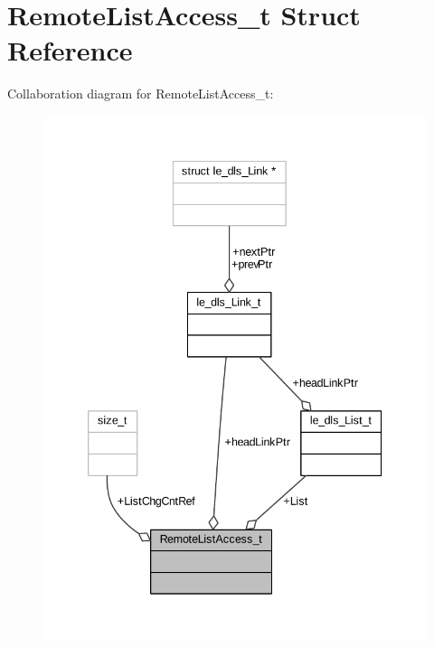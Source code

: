\hypertarget{struct_remote_list_access__t}{}\section{Remote\+List\+Access\+\_\+t Struct Reference}
\label{struct_remote_list_access__t}


Collaboration diagram for Remote\+List\+Access\+\_\+t\+:
\nopagebreak
\begin{figure}[H]
\begin{center}
\leavevmode
\includegraphics[width=339pt]{struct_remote_list_access__t__coll__graph}
\end{center}
\end{figure}
